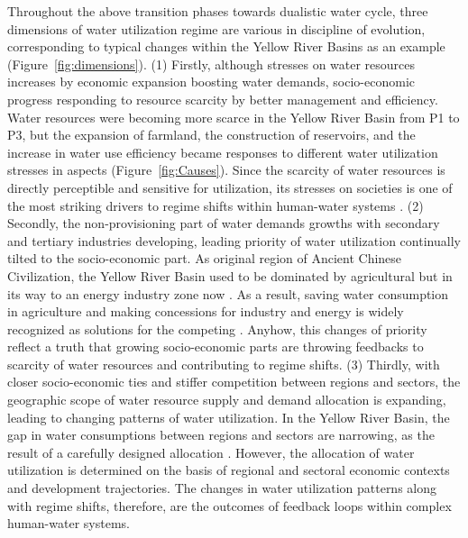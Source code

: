 \documentclass[9pt, twocolumn, twoside, lineno]{pnas-new}
\begin{document}
Throughout the above transition phases towards dualistic water cycle, three dimensions of water utilization regime are various in discipline of evolution, corresponding to typical changes within the Yellow River Basins as an example (Figure~\ref{fig:dimensions}). 
(1) Firstly, although stresses on water resources increases by economic expansion boosting water demands, socio-economic progress responding to resource scarcity by better management and efficiency. Water resources were becoming more scarce in the Yellow River Basin from P1 to P3, but the expansion of farmland, the construction of reservoirs, and the increase in water use efficiency became responses to different water utilization stresses in aspects (Figure~\ref{fig:Causes}). Since the scarcity of water resources is directly perceptible and sensitive for utilization, its stresses on societies is one of the most striking drivers to regime shifts within human-water systems \cite{qinFlexibilityIntensityGlobal2019}.
(2) Secondly, the non-provisioning part of water demands growths with secondary and tertiary industries developing, leading priority of water utilization continually tilted to the socio-economic part. As original region of Ancient Chinese Civilization, the Yellow River Basin used to be dominated by agricultural but in its way to an energy industry zone now \cite{WillEnergyBases}. As a result, saving water consumption in agriculture and making concessions for industry and energy is widely recognized as solutions for the competing \cite{xiangWillEnergyIndustry2016,bebbWaterRightsTransfers2011}. Anyhow, this changes of priority reflect a truth that growing socio-economic parts are throwing feedbacks to scarcity of water resources and contributing to regime shifts.
(3) Thirdly, with closer socio-economic ties and stiffer competition between regions and sectors, the geographic scope of water resource supply and demand allocation is expanding, leading to changing patterns of water utilization. In the Yellow River Basin, the gap in water consumptions between regions and sectors are narrowing, as the result of a carefully designed allocation \cite{wangThirtyYearsYellow2018}. However, the allocation of water utilization is determined on the basis of regional and sectoral economic contexts and development trajectories\cite{wangThirtyYearsYellow2018}. The changes in water utilization patterns along with regime shifts, therefore, are the outcomes of feedback loops within complex human-water systems.
\end{document}
